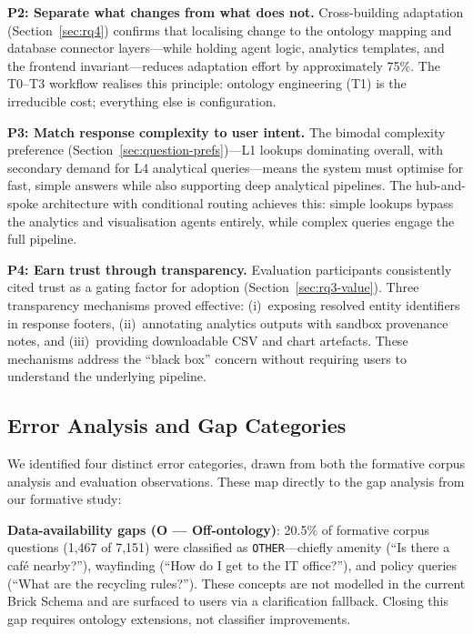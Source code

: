 \documentclass[acmsmall]{acmart}
\begin{document}
\textbf{P2: Separate what changes from what does not.} Cross-building adaptation (Section~\ref{sec:rq4}) confirms that localising change to the ontology mapping and database connector layers---while holding agent logic, analytics templates, and the frontend invariant---reduces adaptation effort by approximately 75\%. The T0--T3 workflow realises this principle: ontology engineering (T1) is the irreducible cost; everything else is configuration.

\textbf{P3: Match response complexity to user intent.} The bimodal complexity preference (Section~\ref{sec:question-prefs})---L1 lookups dominating overall, with secondary demand for L4 analytical queries---means the system must optimise for fast, simple answers while also supporting deep analytical pipelines. The hub-and-spoke architecture with conditional routing achieves this: simple lookups bypass the analytics and visualisation agents entirely, while complex queries engage the full pipeline.

\textbf{P4: Earn trust through transparency.} Evaluation participants consistently cited trust as a gating factor for adoption (Section~\ref{sec:rq3-value}). Three transparency mechanisms proved effective: (i)~exposing resolved entity identifiers in response footers, (ii)~annotating analytics outputs with sandbox provenance notes, and (iii)~providing downloadable CSV and chart artefacts. These mechanisms address the ``black box'' concern without requiring users to understand the underlying pipeline.

\subsection{Error Analysis and Gap Categories}
\label{sec:errors}

We identified four distinct error categories, drawn from both the formative corpus analysis and evaluation observations. These map directly to the gap analysis from our formative study:

\textbf{Data-availability gaps (O --- Off-ontology)}: 20.5\% of formative corpus questions (1{,}467 of 7{,}151) were classified as \texttt{OTHER}---chiefly amenity (``Is there a caf\'{e} nearby?''), wayfinding (``How do I get to the IT office?''), and policy queries (``What are the recycling rules?''). These concepts are not modelled in the current Brick Schema and are surfaced to users via a clarification fallback. Closing this gap requires ontology extensions, not classifier improvements.
\end{document}
